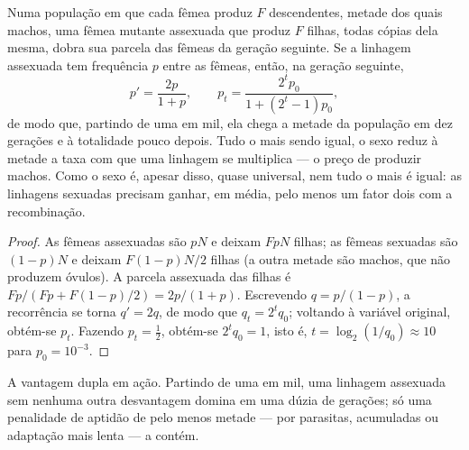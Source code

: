 \begin{theorem}\label{thm:b2:asexual-reproduction:twofold}
Numa população em que cada fêmea produz $F$ descendentes, metade dos
quais machos, uma fêmea mutante assexuada que produz $F$ filhas, todas
cópias dela mesma, dobra sua parcela das fêmeas da geração seguinte.
Se a linhagem assexuada tem frequência $p$ entre as fêmeas, então, na
geração seguinte,
\[
p' = \frac{2p}{1 + p}, \qquad p_t = \frac{2^t p_0}{1 + (2^t - 1)p_0},
\]
de modo que, partindo de uma em mil, ela chega a metade da população em
dez gerações e à totalidade pouco depois. Tudo o mais sendo igual, o
sexo reduz à metade a taxa com que uma linhagem se multiplica --- o
preço de produzir machos. Como o sexo é, apesar disso, quase universal,
nem tudo o mais é igual: as linhagens sexuadas precisam ganhar, em
média, pelo menos um fator dois com a recombinação.
\end{theorem}
\begin{proof}
As fêmeas assexuadas são $pN$ e deixam $FpN$ filhas; as fêmeas
sexuadas são $(1 - p)N$ e deixam $F(1 - p)N/2$ filhas (a outra metade
são machos, que não produzem óvulos). A parcela assexuada das filhas é
$Fp/(Fp + F(1 - p)/2) = 2p/(1 + p)$. Escrevendo $q = p/(1 -
p)$, a recorrência se torna $q' = 2q$, de modo que $q_t = 2^t q_0$;
voltando à variável original, obtém-se $p_t$. Fazendo $p_t = \tfrac12$, obtém-se
$2^t q_0 = 1$, isto é,
$t = \log_2(1/q_0) \approx 10$ para $p_0 = 10^{-3}$.
\end{proof}

\begin{omfigure}

{\small A vantagem dupla em ação. Partindo de uma em mil, uma linhagem
assexuada sem nenhuma outra desvantagem domina em uma dúzia de
gerações; só uma penalidade de aptidão de pelo menos metade --- por
parasitas,  acumuladas ou adaptação mais lenta --- a contém.}
\end{omfigure}


